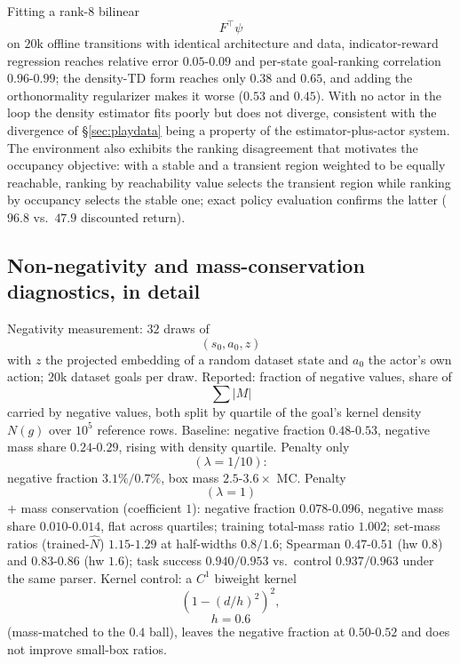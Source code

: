 \documentclass{article}
\newcommand{\Nhat}{\hat N}
\begin{document}
Fitting a rank-$8$ bilinear
\begin{equation}
F^{\top}\psi
\end{equation}
on $20$k offline transitions with identical architecture and data, indicator-reward regression reaches relative error $0.05$-$0.09$ and per-state goal-ranking correlation $0.96$-$0.99$; the density-TD form reaches only $0.38$ and $0.65$, and adding the orthonormality regularizer makes it worse ($0.53$ and $0.45$).
With no actor in the loop the density estimator fits poorly but does not diverge, consistent with the divergence of \S\ref{sec:playdata} being a property of the estimator-plus-actor system.
The environment also exhibits the ranking disagreement that motivates the occupancy objective: with a stable and a transient region weighted to be equally reachable, ranking by reachability value selects the transient region while ranking by occupancy selects the stable one; exact policy evaluation confirms the latter ($96.8$ vs.\ $47.9$ discounted return).

\subsection{Non-negativity and mass-conservation diagnostics, in detail}
\label{app:validity}

Negativity measurement: $32$ draws of
\begin{equation}
(s_0,a_0,z)
\end{equation}
with $z$ the projected embedding of a random dataset state and $a_0$ the actor's own action; $20$k dataset goals per draw.
Reported: fraction of negative values, share of
\begin{equation}
\sum|M|
\end{equation}
carried by negative values, both split by quartile of the goal's kernel density $N(g)$ over $10^5$ reference rows.
Baseline: negative fraction $0.48$-$0.53$, negative mass share $0.24$-$0.29$, rising with density quartile.
Penalty only
\begin{equation}
(\lambda{=}1/10):
\end{equation}
negative fraction $3.1\%/0.7\%$, box mass $2.5$-$3.6\times$ MC.
Penalty
\begin{equation}
(\lambda{=}1)
\end{equation}
$+$ mass conservation (coefficient $1$): negative fraction $0.078$-$0.096$, negative mass share $0.010$-$0.014$, flat across quartiles; training total-mass ratio $1.002$; set-mass ratios (trained-$\Nhat$) $1.15$-$1.29$ at half-widths $0.8/1.6$; Spearman $0.47$-$0.51$ (hw $0.8$) and $0.83$-$0.86$ (hw $1.6$); task success $0.940/0.953$ vs.\ control $0.937/0.963$ under the same parser.
Kernel control: a $C^1$ biweight kernel
\begin{equation}
(1-(d/h)^2)^2,
\end{equation}
\begin{equation}
h=0.6
\end{equation}
(mass-matched to the $0.4$ ball), leaves the negative fraction at $0.50$-$0.52$ and does not improve small-box ratios.
\end{document}
